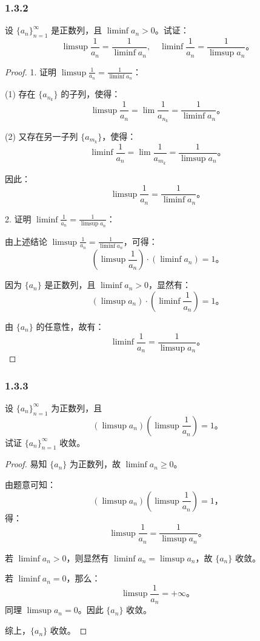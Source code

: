 \documentclass[12pt]{ctexart}
\begin{document}
\subsubsection*{1.3.2} 
设 $\{a_n\}_{n=1}^\infty$ 是正数列，且 $\liminf a_n > 0$。试证：
\[
\limsup \frac{1}{a_n} = \frac{1}{\liminf a_n}, \quad \liminf \frac{1}{a_n} = \frac{1}{\limsup a_n}。
\]
\begin{proof}
1. 证明 $\limsup \frac{1}{a_n} = \frac{1}{\liminf a_n}$：

(1) 存在 $\{a_{n_k}\}$ 的子列，使得：
\[
\limsup \frac{1}{a_n} = \lim \frac{1}{a_{n_k}} = \frac{1}{\liminf a_n}。
\]

(2) 又存在另一子列 $\{a_{m_k}\}$，使得：
\[
\liminf \frac{1}{a_n} = \lim \frac{1}{a_{m_k}} = \frac{1}{\limsup a_n}。
\]

因此：
\[
\limsup \frac{1}{a_n} = \frac{1}{\liminf a_n}。
\]

2. 证明 $\liminf \frac{1}{a_n} = \frac{1}{\limsup a_n}$：

由上述结论 $\limsup \frac{1}{a_n} = \frac{1}{\liminf a_n}$，可得：
\[
(\limsup \frac{1}{a_n}) \cdot (\liminf a_n) = 1。
\]

因为 $\{a_n\}$ 是正数列，且 $\liminf a_n > 0$，显然有：
\[
(\limsup a_n) \cdot (\liminf \frac{1}{a_n}) = 1。
\]

由 $\{a_n\}$ 的任意性，故有：
\[
\liminf \frac{1}{a_n} = \frac{1}{\limsup a_n}。
\]
\end{proof}

\subsubsection*{1.3.3} 
设 $\{a_n\}_{n=1}^\infty$ 为正数列，且
\[
(\limsup a_n) \left(\limsup \frac{1}{a_n}\right) = 1。
\]
试证 $\{a_n\}_{n=1}^\infty$ 收敛。

\begin{proof}
易知 $\{a_n\}$ 为正数列，故 $\liminf a_n \geq 0$。

由题意可知：
\[
(\limsup a_n) \left(\limsup \frac{1}{a_n}\right) = 1，
\]
得：
\[
\limsup \frac{1}{a_n} = \frac{1}{\limsup a_n}。
\]

若 $\liminf a_n > 0$，则显然有 $\liminf a_n = \limsup a_n$，故 $\{a_n\}$ 收敛。

若 $\liminf a_n = 0$，那么：
\[
\limsup \frac{1}{a_n} = +\infty。
\]
同理 $\limsup a_n = 0$。因此 $\{a_n\}$ 收敛。

综上，$\{a_n\}$ 收敛。
\end{proof}
\end{document}
